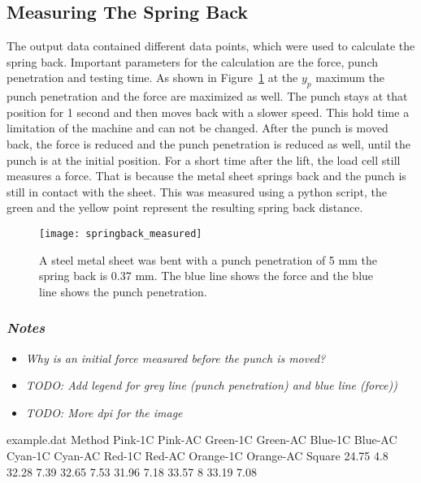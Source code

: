 \subsection{Measuring The Spring Back} \label{sec:measuring_the_spring_back}
The output data contained different data points, which were used to calculate the spring back.
Important parameters for the calculation are the force, punch penetration and testing time.
As shown in Figure~\ref{fig:springback_measured} at the $y_p$ maximum the punch penetration and the force are maximized as well. The punch stays at that position for 1 second and then moves back with a slower speed. This hold time a limitation of the machine and can not be changed.
After the punch is moved back, the force is reduced and the punch penetration is reduced as well, until the punch is at the initial position. For a short time after the lift, the load  cell still measures a force. That is because the metal sheet springs back and the punch is still in contact with the sheet. This was measured using a python script, the green and the yellow point represent the resulting spring back distance.

\begin{figure}[H]
    \centering
    \texttt{[image: springback\_measured]}
    \caption{A steel metal sheet was bent with a punch penetration of 5 mm the spring back is 0.37 mm. The blue line shows the force and the blue line shows the punch penetration.}
    \label{fig:springback_measured}
\end{figure}

\subsubsection*{\textit{Notes}}
\begin{itemize}
    \item \textit{Why is an initial force measured before the punch is moved?}
    \item \textit{TODO: Add legend for grey line (punch penetration) and blue line (force))}
    \item \textit{TODO: More dpi for the image}
\end{itemize}


\begin{filecontents*}{example.dat}
    Method Pink-1C Pink-AC Green-1C Green-AC Blue-1C Blue-AC Cyan-1C Cyan-AC Red-1C Red-AC Orange-1C Orange-AC
    Square 24.75 4.8 32.28 7.39 32.65 7.53 31.96 7.18 33.57 8 33.19 7.08
\end{filecontents*}


